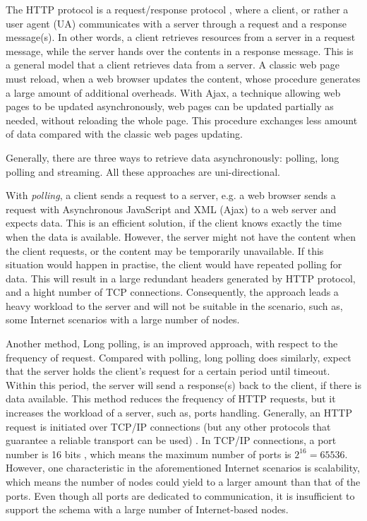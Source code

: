 The HTTP protocol is a request/response protocol \cite{fielding1999hypertext}, where a client, or rather a user agent (UA) communicates with a server through a request and a response message(s). In other words, a client retrieves resources from a server in a request message, while the server hands over the contents in a response message. This is a general model that a client retrieves data from a server. A classic web page must reload, when a web browser updates the content, whose procedure generates a large amount of additional overheads. With Ajax, a technique allowing web pages to be updated asynchronously, web pages can be updated partially as needed, without reloading the whole page. This procedure exchanges less amount of data compared with the classic web pages updating. 

Generally, there are three ways to retrieve data asynchronously\cite{lubbers2010html5}: polling, long polling and streaming. All these approaches are uni-directional. 

With \emph{polling}, a client sends a request to a server, e.g. a web browser sends a request with Asynchronous JavaScript and XML (Ajax) \cite{garrett2005ajax} to a web server and expects data. This is an efficient solution, if the client knows exactly the time when the data is available. However, the server might not have the content when the client requests, or the content may be temporarily unavailable. If this situation would happen in practise, the client would have repeated polling for data. This will result in a large redundant headers generated by HTTP protocol, and a hight number of TCP connections. Consequently, the approach leads a heavy workload to the server and will not be suitable in the scenario, such as, some Internet scenarios with a large number of nodes. 

Another method, Long polling, is an improved approach, with respect to the frequency of request. Compared with polling, long polling does similarly, expect that the server holds the client's request for a certain period until timeout. Within this period, the server will send a response(s) back to the client, if there is data available. This method reduces the frequency of HTTP requests, but it increases the workload of a server, such as, ports handling. Generally, an HTTP request is initiated over TCP/IP connections (but any other protocols that guarantee a reliable transport can be used) \cite {fielding1999hypertext}. In TCP/IP connections, a port number is 16 bits \cite{postel2003rfc}, which means the maximum number of ports is \(  2^{16}  = 65536 \). However, one characteristic in the aforementioned Internet scenarios is scalability, which means the number of nodes could yield to a larger amount than that of the ports. Even though all ports are dedicated to communication, it is insufficient to support the schema with a large number of Internet-based nodes. 


